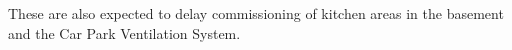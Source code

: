 These are also expected to delay commissioning of kitchen areas in the basement and the Car Park Ventilation System.

\setcounter{chapter}{0}





%
%
%
%
%
